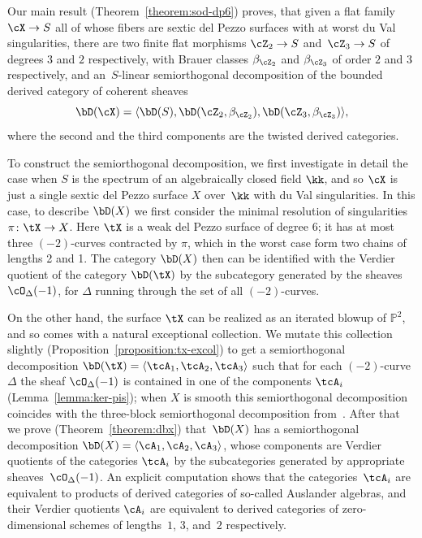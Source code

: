 \documentclass[11pt]{amsart}
\renewcommand{\P}{{\mathbb{P}}}
\theoremstyle{plain}
\theoremstyle{definition}
\theoremstyle{remark}
\begin{document}

Our main result (Theorem~\ref{theorem:sod-dp6}) proves, 
that given a flat family $\cX \to S$ all of whose fibers are sextic del Pezzo surfaces with at worst du Val singularities,
there are two finite flat morphisms $\cZ_2 \to S$ and~$\cZ_3 \to S$ of degrees $3$ and $2$ respectively, 
with Brauer classes $\beta_{\cZ_2}$ and $\beta_{\cZ_3}$ of order $2$ and $3$ respectively,
and an~$S$-linear semiorthogonal decomposition of the bounded derived category of coherent sheaves
\begin{equation*}
\bD(\cX) = \langle \bD(S), \bD(\cZ_2,\beta_{\cZ_2}), \bD(\cZ_3,\beta_{\cZ_3}) \rangle,
\end{equation*}
where the second and the third components are the twisted derived categories.

\medskip


To construct the semiorthogonal decomposition, we first investigate in detail the case 
when $S$ is the spectrum of an algebraically closed field $\kk$, 
and so $\cX$ is just a single sextic del Pezzo surface $X$ over~$\kk$ with du Val singularities.
In this case, to describe $\bD(X)$ we first consider the minimal resolution of singularities~\mbox{$\pi \colon \tX \to X$}.
Here $\tX$ is a weak del Pezzo surface of degree 6; it has at most three $(-2)$-curves contracted by $\pi$, 
which in the worst case form two chains of lengths 2 and 1.
The category $\bD(X)$ then can be identified with the Verdier quotient of the category $\bD(\tX)$ 
by the subcategory generated by the sheaves~$\cO_\Delta(-1)$, 
for $\Delta$ running through the set of all $(-2)$-curves.

On the other hand, the surface $\tX$ can be realized as an iterated blowup of $\P^2$, and so comes with a natural exceptional collection.
We mutate this collection slightly (Proposition~\ref{proposition:tx-excol}) 
to get a semiorthogonal decomposition $\bD(\tX) = \langle \tcA_1, \tcA_2, \tcA_3 \rangle$ 
such that for each $(-2)$-curve $\Delta$ the sheaf $\cO_\Delta(-1)$ is contained in one of the components $\tcA_i$ (Lemma~\ref{lemma:ker-pis});
when $X$ is smooth this semiorthogonal decomposition coincides with the three-block semiorthogonal decomposition from~\cite{karpov-nogin}.
After that we prove (Theorem~\ref{theorem:dbx}) that~$\bD(X)$ has a semiorthogonal decomposition $\bD(X) = \langle \cA_1, \cA_2, \cA_3 \rangle$, 
whose components are Verdier quotients of the categories $\tcA_i$ by the subcategories generated by appropriate sheaves~$\cO_\Delta(-1)$.
An explicit computation shows that the categories~$\tcA_i$ are equivalent to products of derived categories of so-called Auslander algebras,
and their Verdier quotients $\cA_i$ are equivalent to derived categories of zero-dimensional schemes of lengths~$1$, $3$, and~$2$ respectively.
\end{document}
